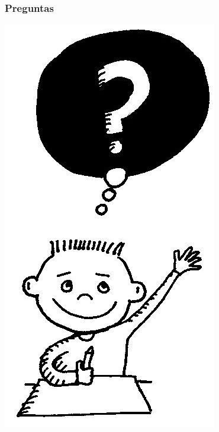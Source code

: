 \documentclass{beamer}
\begin{document}
\begin{frame}
	\frametitle{Preguntas}
	\begin{center}
		\bigskip		
		\includegraphics[scale=.25]{Imagenes/preguntas.jpg}
	\end{center}
\end{frame}
\end{document}
